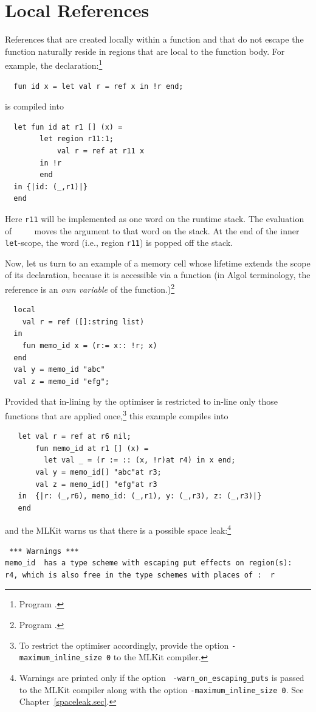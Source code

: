 \documentclass[12pt]{book}
\begin{document}
\section{Local References}
References  that are created locally within a
function and that do not escape the function naturally reside in
regions that are local to the function body.  For example, the
declaration:\footnote{Program .}
\begin{verbatim}
  fun id x = let val r = ref x in !r end;
\end{verbatim}
is compiled into
\begin{verbatim}
  let fun id at r1 [] (x) =
        let region r11:1;
            val r = ref at r11 x
        in !r
        end
  in {|id: (_,r1)|}
  end
\end{verbatim}
Here {\tt r11} will be implemented as one word on the runtime stack.
The evaluation of ~~~~ moves the argument
 to that word on the stack. At the end of the inner
\texttt{let}-scope, the word (i.e., region \texttt{r11}) is popped off the stack.

Now, let us turn to an example of a memory cell whose lifetime extends
the scope of its declaration, because it is accessible via a function
(in Algol terminology, the reference is an {\em own variable}
%
of the function.)\footnote{Program .}
\begin{verbatim}
  local
    val r = ref ([]:string list)
  in
    fun memo_id x = (r:= x:: !r; x)
  end
  val y = memo_id "abc"
  val z = memo_id "efg";
\end{verbatim}
Provided that in-lining by the optimiser is restricted to in-line only
those functions that are applied once,\footnote{To restrict the
  optimiser accordingly, provide the option
  \texttt{-maximum\_inline\_size 0} to the MLKit compiler.} this example
compiles into
\begin{verbatim}
   let val r = ref at r6 nil;
       fun memo_id at r1 [] (x) =
         let val _ = (r := :: (x, !r)at r4) in x end;
       val y = memo_id[] "abc"at r3;
       val z = memo_id[] "efg"at r3
   in  {|r: (_,r6), memo_id: (_,r1), y: (_,r3), z: (_,r3)|}
   end
\end{verbatim}
and the MLKit warns us that there is a possible space
leak:\footnote{Warnings are printed only if the option {\tt
    -warn\_on\_escaping\_puts} is passed to the MLKit compiler along
  with the option \texttt{-maximum\_inline\_size 0}. See
  Chapter~\ref{spaceleak.sec}.}
\begin{verbatim}
 *** Warnings ***
memo_id	 has a type scheme with escaping put effects on region(s):
r4, which is also free in the type schemes with places of :  r
\end{verbatim}
\end{document}
